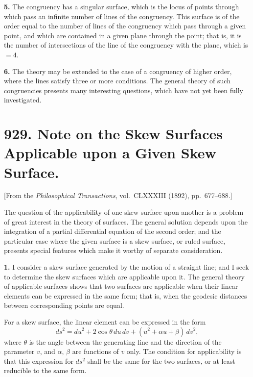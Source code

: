 \documentclass[12pt,a4paper]{article}
\begin{document}
\textbf{5.} The congruency has a singular surface, which is the locus of points
through which pass an infinite number of lines of the congruency. This surface
is of the order equal to the number of lines of the congruency which pass through
a given point, and which are contained in a given plane through the point; that is,
it is the number of intersections of the line of the congruency with the plane, which
is $= 4$.

\textbf{6.} The theory may be extended to the case of a congruency of higher
order, where the lines satisfy three or more conditions. The general theory of such
congruencies presents many interesting questions, which have not yet been fully
investigated.



\newpage
\section*{929. Note on the Skew Surfaces Applicable upon a Given Skew Surface.}

[From the \textit{Philosophical Transactions}, vol.~CLXXXIII (1892), pp.~677--688.]

\bigskip

The question of the applicability of one skew surface upon another is a
problem of great interest in the theory of surfaces. The general solution depends
upon the integration of a partial differential equation of the second order; and the
particular case where the given surface is a skew surface, or ruled surface, presents
special features which make it worthy of separate consideration.

\textbf{1.} I consider a skew surface generated by the motion of a straight line;
and I seek to determine the skew surfaces which are applicable upon it. The
general theory of applicable surfaces shows that two surfaces are applicable when
their linear elements can be expressed in the same form; that is, when the
geodesic distances between corresponding points are equal.

For a skew surface, the linear element can be expressed in the form
\[
ds^2 = du^2 + 2\cos\theta\,du\,dv + (u^2 + \alpha u + \beta)\,dv^2,
\]
where $\theta$ is the angle between the generating line and the direction of the parameter
$v$, and $\alpha$, $\beta$ are functions of $v$ only. The condition for applicability is that this
expression for $ds^2$ shall be the same for the two surfaces, or at least reducible to
the same form.
\end{document}
